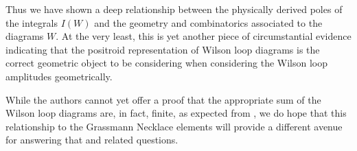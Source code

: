 \documentclass[11pt]{article}
\theoremstyle{remark}
\theoremstyle{definition}
\begin{document}
Thus we have shown a deep relationship between the physically derived poles of the integrals $I(W)$ and the geometry and combinatorics associated to the diagrams $W$. At the very least, this is yet another piece of circumstantial evidence indicating that the positroid representation of Wilson loop diagrams is the correct geometric object to be considering when considering the Wilson loop amplitudes geometrically. 

While the authors cannot yet offer a proof that the appropriate sum of the Wilson loop diagrams are, in fact, finite, as expected from \cite{Alday:2007hr, ParkeTaylorids}, we do hope that this relationship to the Grassmann Necklace elements will provide a different avenue for answering that and related questions. 










\end{document}
